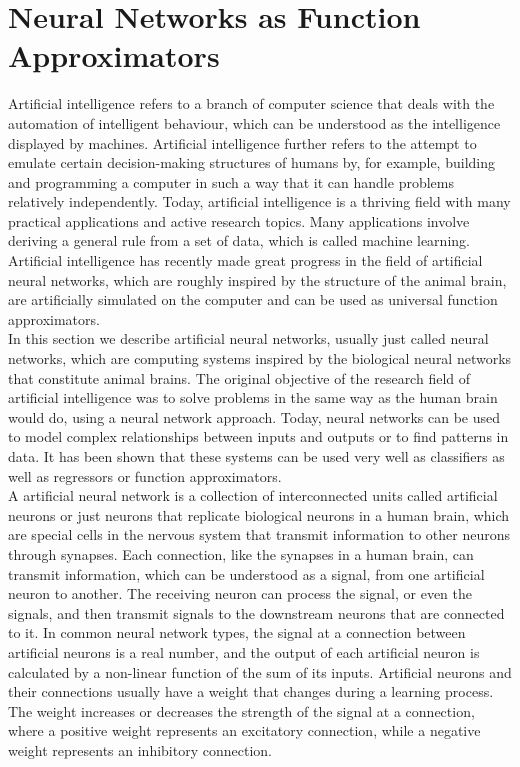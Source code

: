 \section{Neural Networks as Function Approximators}
\label{ch1:sec3}

Artificial intelligence refers to a branch of computer science that deals with the automation of intelligent behaviour, which can be understood as the intelligence displayed by machines. Artificial intelligence further refers to the attempt to emulate certain decision-making structures of humans by, for example, building and programming a computer in such a way that it can handle problems relatively independently. Today, artificial intelligence is a thriving field with many practical applications and active research topics. Many applications involve deriving a general rule from a set of data, which is called machine learning. Artificial intelligence has recently made great progress in the field of artificial neural networks, which are roughly inspired by the structure of the animal brain, are artificially simulated on the computer and can be used as universal function approximators. \\
In this section we describe artificial neural networks, usually just called neural networks, which are computing systems inspired by the biological neural networks that constitute animal brains. The original objective of the research field of artificial intelligence was to solve problems in the same way as the human brain would do, using a neural network approach. Today, neural networks can be used to model complex relationships between inputs and outputs or to find patterns in data. It has been shown that these systems can be used very well as classifiers as well as regressors or function approximators. \\
A artificial neural network is a collection of interconnected units called artificial neurons or just neurons that replicate biological neurons in a human brain, which are special cells in the nervous system that transmit information to other neurons through synapses. Each connection, like the synapses in a human brain, can transmit information, which can be understood as a signal, from one artificial neuron to another. The receiving neuron can process the signal, or even the signals, and then transmit signals to the downstream neurons that are connected to it. In common neural network types, the signal at a connection between artificial neurons is a real number, and the output of each artificial neuron is calculated by a non-linear function of the sum of its inputs. Artificial neurons and their connections usually have a weight that changes during a learning process. The weight increases or decreases the strength of the signal at a connection, where a positive weight represents an excitatory connection, while a negative weight represents an inhibitory connection. \\
